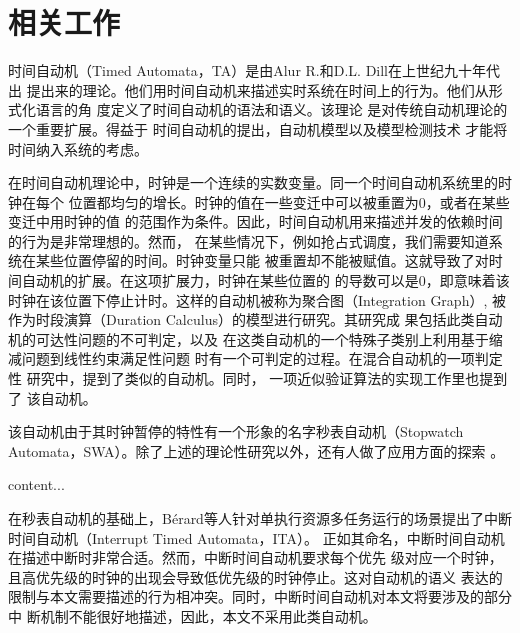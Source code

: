
\chapter{相关工作}
\label{cha:related_work}


时间自动机（Timed Automata，TA）是由Alur R.和D.L. Dill在上世纪九十年代出
提出来的理论。他们用时间自动机来描述实时系统在时间上的行为。他们从形式化语言的角
度定义了时间自动机的语法和语义\cite{Alur:1994:TTA:180782.180519}。该理论
是对传统自动机理论\cite{Hopcroft:2006:IAT:1196416}的一个重要扩展。得益于
时间自动机的提出，自动机模型以及模型检测技术\cite{Clarke:2000:MC:332656}
才能将时间纳入系统的考虑。

在时间自动机理论中，时钟是一个连续的实数变量。同一个时间自动机系统里的时钟在每个
位置都均匀的增长。时钟的值在一些变迁中可以被重置为0，或者在某些变迁中用时钟的值
的范围作为条件。因此，时间自动机用来描述并发的依赖时间的行为是非常理想的。然而，
在某些情况下，例如抢占式调度，我们需要知道系统在某些位置停留的时间。时钟变量只能
被重置却不能被赋值。这就导致了对时间自动机的扩展。在这项扩展力，时钟在某些位置的
的导数可以是0，即意味着该时钟在该位置下停止计时。这样的自动机被称为聚合图（Integration
Graph）\cite{Kesten:1999:DIG:302392.302397}, 被作为时段演算（Duration 
Calculus）\cite{DBLP:journals/ipl/ChaochenHR91}的模型进行研究。其研究成
果包括此类自动机的可达性问题的不可判定\cite{Alur04decisionproblems}，以及
在这类自动机的一个特殊子类别上利用基于缩减问题到线性约束满足性问题\cite{Apt:2003:PCP:1237975}
时有一个可判定的过程。在混合自动机\cite{Henzinger96thetheory}的一项判定性
研究\cite{McManis:1994:SAD:647763.735660}中，提到了类似的自动机。同时，
一项近似验证算法的实现工作\cite{Cassez:2000:IPS:646735.701625}里也提到了
该自动机。

该自动机由于其时钟暂停的特性有一个形象的名字\pozhehao 秒表自动机（Stopwatch
Automata，SWA）。除了上述的理论性研究以外，还有人做了应用方面的探索
\cite{Abdeddaim:2002:PJS:646486.694487}。

\begin{definition}
content...
\end{definition}

在秒表自动机的基础上，B{\'e}rard等人针对单执行资源多任务运行的场景提出了中断
时间自动机（Interrupt Timed Automata，ITA）。\cite{Berard:2012:ITA:2158996.2159045}
正如其命名，中断时间自动机在描述中断时非常合适。然而，中断时间自动机要求每个优先
级对应一个时钟，且高优先级的时钟的出现会导致低优先级的时钟停止。这对自动机的语义
表达的限制与本文需要描述的行为相冲突。同时，中断时间自动机对本文将要涉及的部分中
断机制不能很好地描述，因此，本文不采用此类自动机。

